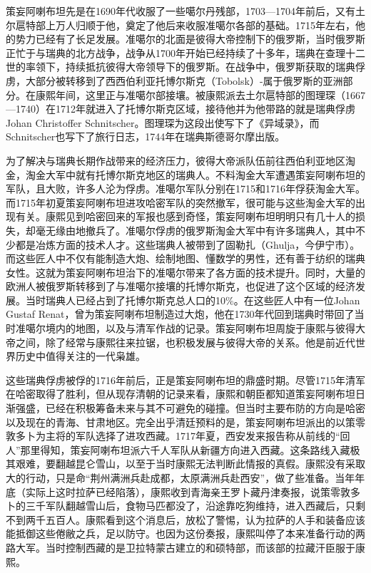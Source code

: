 
策妄阿喇布坦先是在1690年代收服了一些噶尔丹残部，1703—1704年前后，又有土尔扈特部上万人归顺于他，奠定了他后来收服准噶尔各部的基础。1715年左右，他的势力已经有了长足发展。准噶尔的北面是彼得大帝控制下的俄罗斯，当时俄罗斯正忙于与瑞典的北方战争，战争从1700年开始已经持续了十多年，瑞典在查理十二世的率领下，持续抵抗彼得大帝领导下的俄罗斯。在战争中，俄罗斯获取的瑞典俘虏，大部分被转移到了西西伯利亚托博尔斯克（Tobolsk）-属于俄罗斯的亚洲部分。在康熙年间，这里正与准噶尔部接壤。被康熙派去土尔扈特部的图理琛（1667—1740）在1712年就进入了托博尔斯克区域，接待他并为他带路的就是瑞典俘虏Johan Christoffer Schnitscher。图理琛为这段出使写下了《异域录》，而Schnitscher也写下了旅行日志，1744年在瑞典斯德哥尔摩出版。



为了解决与瑞典长期作战带来的经济压力，彼得大帝派队伍前往西伯利亚地区淘金，淘金大军中就有托博尔斯克地区的瑞典人。不料淘金大军遭遇策妄阿喇布坦的军队，且大败，许多人沦为俘虏。准噶尔军队分别在1715和1716年俘获淘金大军。而1715年初夏策妄阿喇布坦进攻哈密军队的突然撤军，很可能与这些淘金大军的出现有关。康熙见到哈密回来的军报也感到奇怪，策妄阿喇布坦明明只有几十人的损失，却毫无缘由地撤兵了。准噶尔俘虏的俄罗斯淘金大军中有许多瑞典人，其中不少都是冶炼方面的技术人才。这些瑞典人被带到了固勒扎（Ghulja，今伊宁市）。而这些匠人中不仅有能制造大炮、绘制地图、懂数学的男性，还有善于纺织的瑞典女性。这就为策妄阿喇布坦治下的准噶尔带来了各方面的技术提升。同时，大量的欧洲人被俄罗斯转移到了与准噶尔接壤的托博尔斯克，也促进了这个区域的经济发展。当时瑞典人已经占到了托博尔斯克总人口的10\%。在这些匠人中有一位Johan Gustaf Renat，曾为策妄阿喇布坦制造过大炮，他在1730年代回到瑞典时带回了当时准噶尔境内的地图，以及与清军作战的记录。策妄阿喇布坦周旋于康熙与彼得大帝之间，除了经常与康熙往来拉锯，也积极发展与彼得大帝的关系。他是前近代世界历史中值得关注的一代枭雄。



这些瑞典俘虏被俘的1716年前后，正是策妄阿喇布坦的鼎盛时期。尽管1715年清军在哈密取得了胜利，但从现存清朝的记录来看，康熙和朝臣都知道策妄阿喇布坦日渐强盛，已经在积极筹备未来与其不可避免的碰撞。但当时主要布防的方向是哈密以及现在的青海、甘肃地区。完全出乎清廷预料的是，策妄阿喇布坦派出的以策零敦多卜为主将的军队选择了进攻西藏。1717年夏，西安发来报告称从前线的“回人”那里得知，策妄阿喇布坦派六千人军队从新疆方向进入西藏。这条路线入藏极其艰难，要翻越昆仑雪山，以至于当时康熙无法判断此情报的真假。康熙没有采取大的行动，只是命“荆州满洲兵赴成都，太原满洲兵赴西安”，做了些准备。当年年底（实际上这时拉萨已经陷落），康熙收到青海亲王罗卜藏丹津奏报，说策零敦多卜的三千军队翻越雪山后，食物马匹都没了，沿途靠吃狗维持，进入西藏后，只剩不到两千五百人。康熙看到这个消息后，放松了警惕，认为拉萨的人手和装备应该能抵御这些倦敝之兵，足以防守。也因为这份奏报，康熙叫停了本来准备行动的两路大军。当时控制西藏的是卫拉特蒙古建立的和硕特部，而该部的拉藏汗臣服于康熙。


